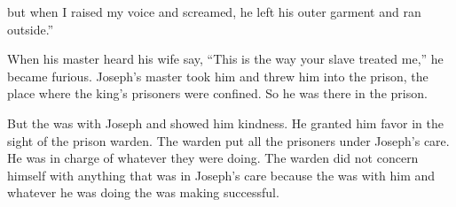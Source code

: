 {but when
I raised
my voice
and screamed,
he left
his outer
garment
and ran
outside.”
\par }{\PP {}When
his master
heard
his wife
say, “This
is the way
your slave
treated me,” he became furious.
Joseph’s
master
took
him and threw
him into
the prison,
the place
where
the king’s
prisoners
were confined.
So he was there
in the prison.
\par }{\PP {}But the
{}
was
with
Joseph
and showed
him kindness.
He granted
him favor
in the sight
of the prison
warden.
The warden
put
all
the prisoners
under Joseph’s
care.
He was
in charge
of whatever
they were doing.
The warden
did not
concern himself with
anything
that was in Joseph’s care
because
the {}
was with
him and whatever
he was
doing
the {}
was making successful.

\par }
